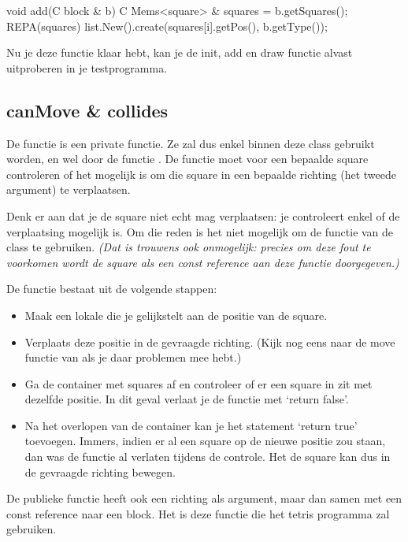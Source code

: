 \begin{code}
void add(C block & b)
{
	 C Mems<square> & squares = b.getSquares();
	 REPA(squares)
	 {
	 	  list.New().create(squares[i].getPos(), b.getType());
	 }
}
\end{code}

Nu je deze functie klaar hebt, kan je de init, add en draw functie alvast uitproberen in je testprogramma.

\subsection{canMove \& collides}
De functie  is een private functie. Ze zal dus enkel binnen deze class gebruikt worden, en wel door de functie . De functie moet voor een bepaalde square controleren of het mogelijk is om die square in een bepaalde richting (het tweede argument) te verplaatsen. 

Denk er aan dat je de square niet echt mag verplaatsen: je controleert enkel of de verplaatsing mogelijk is. Om die reden is het niet mogelijk om de functie  van de class  te gebruiken. \textsl{(Dat is trouwens ook onmogelijk: precies om deze fout te voorkomen wordt de square als een const reference aan deze functie doorgegeven.)}

De functie bestaat uit de volgende stappen:

\begin{itemize}
  \item Maak een lokale  die je gelijkstelt aan de positie van de square.
	\item Verplaats deze positie in de gevraagde richting. (Kijk nog eens naar de move functie van  als je daar problemen mee hebt.)
	\item Ga de container met squares af en controleer of er een square in zit met dezelfde positie. In dit geval verlaat je de functie met `return false'.
	\item Na het overlopen van de container kan je het statement `return true' toevoegen. Immers, indien er al een square op de nieuwe positie zou staan, dan was de functie al verlaten tijdens de controle. Het de square kan dus in de gevraagde richting bewegen.
\end{itemize}

De publieke functie  heeft ook een richting als argument, maar dan samen met een const reference naar een block. Het is deze functie die het tetris programma zal gebruiken.


